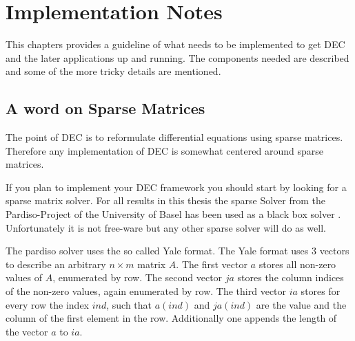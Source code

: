 


\newpage
\section{Implementation Notes}
This chapters provides a guideline of what needs to be implemented to get DEC and the later applications up and running. The components needed are described and some of the more tricky details are mentioned.

\subsection{A word on Sparse Matrices}
The point of DEC is to reformulate differential equations using sparse matrices. Therefore any implementation of DEC is somewhat centered around sparse matrices.

If you plan to implement your DEC framework you should start by looking for a sparse matrix solver. For all results in this thesis the sparse Solver from the Pardiso-Project of the University of Basel has been used as a black box solver \cite{pardiso1}. Unfortunately it is not free-ware but any other sparse solver will do as well.


The pardiso solver uses the so called Yale format. The Yale format uses 3 vectors to describe an arbitrary $n\times m$ matrix $A$. The first vector $a$ stores all non-zero values of $A$, enumerated by row. The second vector $ja$ stores the column indices of the non-zero values, again enumerated by row. The third vector $ia$ stores for every row the index $ind$, such that $a(ind)$ and $ja(ind)$ are the value and the column of the first element in the row. Additionally one appends the length of the vector $a$ to $ia$.

